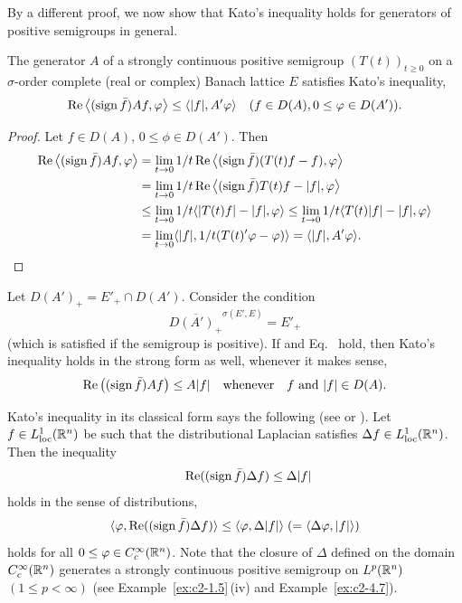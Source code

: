 By a different proof, we now show that Kato's inequality holds for generators of positive semigroups in general.
\begin{theorem}\label{thm:c2-2.4}
%
The generator $A$ of a strongly continuous positive semigroup $(T(t))_{t \geq 0}$ on a $\sigma$-order complete (real or complex) Banach lattice $E$ satisfies Kato's inequality, \ie
\begin{equation*} %
\Re\left\langle(\sign \bar{f})Af,\phi \right\rangle \leq \langle |f|,A'\phi \rangle \quad (f \in D(A), 0 \leq \phi \in D(A')).
\end{equation*}
\end{theorem}
\begin{proof}
Let $f \in D(A)$, $0 \leq \phi \in D(A')$.
Then
\begin{align*}
\Re\left\langle(\sign \bar{f})Af, \phi \right\rangle 
	&= \lim_{t \to 0} 1/t \Re\left\langle(\sign \bar{f})(T(t)f - f), \phi \right\rangle \\
	&= \lim_{t \to 0} 1/t \Re\left\langle(\sign \bar{f})T(t)f - |f|, \phi \right\rangle \\
	&\leq \lim_{t \to 0} 1/t \langle |T(t)f| - |f|, \phi \rangle 
	\leq \lim_{t \to 0} 1/t \langle T(t)|f| - |f|, \phi \rangle\\
	&= \lim_{t \to 0} \langle |f|, 1/t(T(t)'\phi - \phi) \rangle
	= \langle |f|, A'\phi \rangle.
\tag*{\qedsymbol}%
\end{align*}
\let\qedsymbol\relax
\end{proof}
Let $D(A')_{+} = E'_{+} \cap D(A')$. 
Consider the condition
\begin{equation}\label{eq:c2-2.9}
\overline{D(A')_{+}}^{\sigma(E',E)} = E'_{+}
\end{equation}
(which is satisfied if the semigroup is positive). 
If    and Eq.~   hold, then Kato's inequality holds in the strong form as well, whenever it makes sense, \ie
\begin{equation}\label{eq:c2-2.10}
\Re\left((\sign \bar{f})Af \right) \leq A|f| \quad \text{whenever}\quad f \text{ and } |f| \in D(A) .
\end{equation}
\begin{example}\label{ex:c2-2.5}
%
Kato's inequality in its classical form says the following (see \textcite{kato:1973} or \textcite[X.27]{reedsimon:1975}).
Let $f \in L^1_{\text{loc}}(\mathbb{R}^n)$ be such that the distributional Laplacian satisfies $\Delta f \in L^1_{\text{loc}}(\mathbb{R}^n)$.
Then the inequality
\begin{equation*} \label{eq:c2-K-classic} \tag*{}
\Re((\sign \bar{f})\Delta f) \leq \Delta|f| 
\end{equation*}
holds in the sense of distributions, \ie
\[
\langle \phi, \Re((\sign \bar{f})\Delta f) \rangle \leq \langle \phi,\Delta|f| \rangle \;(= \langle \Delta \phi,|f| \rangle)
\]
holds for all $0 \leq \phi \in C_{c}^{\infty}(\R^n)$.
Note that the closure of\/ $\Delta$ defined on the domain $C_{c}^{\infty}(\mathbb{R}^n)$ generates a strongly continuous positive semigroup on $L^p(\mathbb{R}^n)$ $(1 \leq p < \infty)$ (see Example~\ref{ex:c2-1.5}\,(iv) and Example~\ref{ex:c2-4.7}).
\end{example}
